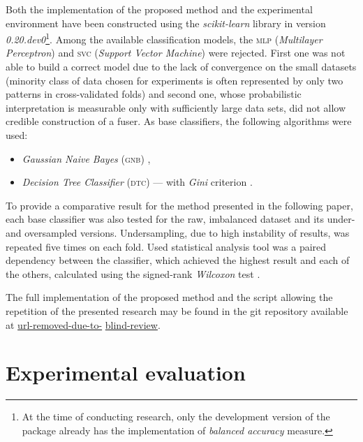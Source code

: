 \documentclass[pmlr]{jmlr}
\begin{document}
Both the implementation of the proposed method and the experimental environment have been constructed using the \emph{scikit-learn} library \citep{scikit-learn} in version \emph{0.20.dev0}\footnote{At the time of conducting research, only the development version of the package already has the implementation of \emph{balanced accuracy} measure.}. Among the available classification models, the \textsc{mlp} (\emph{Multilayer Perceptron}) and \textsc{svc} (\emph{Support Vector Machine}) were rejected. First one was not able to build a correct model due to the lack of convergence on the small datasets (minority class of data chosen for experiments is often represented by only two patterns in cross-validated folds) and second one, whose probabilistic interpretation is measurable only with sufficiently large data sets, did not allow credible construction of a fuser. As base classifiers, the following algorithms were used:

\begin{itemize}
	\item \emph{Gaussian Naive Bayes} (\textsc{gnb}) \citep{gnb},
	\item \emph{Decision Tree Classifier} (\textsc{dtc}) --- with \emph{Gini} criterion \citep{loh2011classification}.
\end{itemize}

To provide a comparative result for the method presented in the following paper, each base classifier was also tested for the raw, imbalanced dataset and its under- and oversampled versions. Undersampling, due to high instability of results, was repeated five times on each fold. Used statistical analysis tool was a paired dependency between the classifier, which achieved the highest result and each of the others, calculated using the signed-rank \emph{Wilcoxon} test \citep{wilcoxon1945individual}.

The full implementation of the proposed method and the script allowing the repetition of the presented research may be found in the git repository available at \url{url-removed-due-to-} \url{blind-review}.

\section{Experimental evaluation}
\label{sec:intro}
\end{document}
